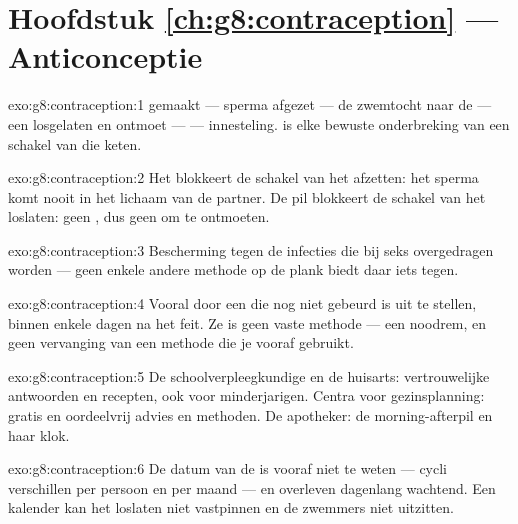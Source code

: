 \section*{Hoofdstuk \ref{ch:g8:contraception} --- Anticonceptie}

\begin{solution}{exo:g8:contraception:1}
 gemaakt --- sperma afgezet --- de zwemtocht naar de  ---
een  losgelaten en ontmoet ---  --- innesteling.
 is elke bewuste onderbreking van een schakel van die keten.
\end{solution}

\begin{solution}{exo:g8:contraception:2}
Het  blokkeert de schakel van het afzetten: het sperma komt nooit
in het lichaam van de partner. De pil blokkeert de schakel van het
loslaten: geen , dus geen  om te ontmoeten.
\end{solution}

\begin{solution}{exo:g8:contraception:3}
Bescherming tegen de infecties die bij seks overgedragen worden --- geen
enkele andere methode op de plank biedt daar iets tegen.
\end{solution}

\begin{solution}{exo:g8:contraception:4}
Vooral door een  die nog niet gebeurd is uit te stellen, binnen
enkele dagen na het feit. Ze is geen vaste methode --- een noodrem, en
geen vervanging van een methode die je vooraf gebruikt.
\end{solution}

\begin{solution}{exo:g8:contraception:5}
De schoolverpleegkundige en de huisarts: vertrouwelijke antwoorden en
recepten, ook voor minderjarigen. Centra voor gezinsplanning: gratis en
oordeelvrij advies en methoden. De apotheker: de morning-afterpil en haar
klok.
\end{solution}

\begin{solution}{exo:g8:contraception:6}
De datum van de  is vooraf niet te weten --- cycli verschillen per
persoon en per maand --- en  overleven dagenlang wachtend. Een
kalender kan het loslaten niet vastpinnen en de zwemmers niet uitzitten.
\end{solution}

